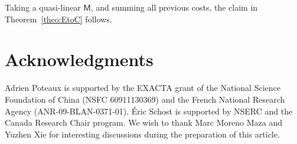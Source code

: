 \documentclass[12pt]{article}
\def\M {\ensuremath{\mathsf{M}}}
\begin{document}
Taking a quasi-linear $\M$, and summing all previous costs, the claim
in Theorem~\ref{theo:EtoC} follows.

\section*{Acknowledgments}

Adrien Poteaux is supported by the EXACTA grant of the National
Science Foundation of China (NSFC 60911130369) and the French National
Research Agency (ANR-09-BLAN-0371-01). \'Eric Schost is supported by
NSERC and the Canada Research Chair program. We wish to thank Marc
Moreno Maza and Yuzhen Xie for interesting discussions during the
preparation of this article.


 
\end{document}
